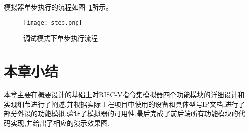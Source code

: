 模拟器单步执行的流程如图~\ref{fig:step}所示。
\begin{figure}[H]
    \centering
    \texttt{[image: step.png]}
    \caption{调试模式下单步执行流程}
    \label{fig:step}
\end{figure}


\section{本章小结}
本章主要在概要设计的基础上对RISC-V指令集模拟器四个功能模块的详细设计和实现细节进行了阐述,并根据实际工程项目中使用的设备和具体型号IP文档,进行了部分外设的功能模拟,验证了模拟器的可用性,最后完成了前后端所有功能模块的代码实现,并给出了相应的演示效果图.



